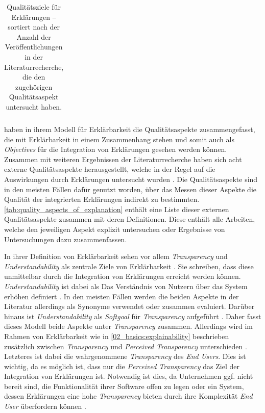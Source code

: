 \begin{table}[b!]
\begin{center}
\begin{tabular}{p{}p{}p{}}
            \toprule
        \end{tabular}
    \end{center}
    \caption{Qualitätsziele für Erklärungen – sortiert nach der Anzahl der Veröffentlichungen in der Literaturrecherche, die den zugehörigen Qualitätsaspekt untersucht haben.}
    \label{tab:quality_aspects_of_explanation}
\end{table}

\citeauthor{chazette_knowledge_nodate} haben in ihrem Modell für Erklärbarkeit die Qualitätsaspekte zusammengefasst, die mit Erklärbarkeit in einem Zusammenhang stehen und somit auch als \textit{Objectives} für die Integration von Erklärungen gesehen werden können. Zusammen mit weiteren Ergebnissen der Literaturrecherche haben sich acht externe Qualitätsaspekte herausgestellt, welche in der Regel auf die Auswirkungen durch Erklärungen untersucht wurden \cite{nunes_systematic_2017, tintarev2007survey}. Die Qualitätsaspekte sind in den meisten Fällen dafür genutzt worden, über das Messen dieser Aspekte die Qualität der integrierten Erklärungen indirekt zu bestimmten. \autoref{tab:quality_aspects_of_explanation} enthält eine Liste dieser externen Qualitätsaspekte zusammen mit deren Definitionen. Diese enthält alle Arbeiten, welche den jeweiligen Aspekt explizit untersuchen oder Ergebnisse von Untersuchungen dazu zusammenfassen.

In ihrer Definition von Erklärbarkeit sehen \citeauthor{chazette_knowledge_nodate} vor allem \textit{Transparency} und \textit{Understandability} als zentrale Ziele von Erklärbarkeit \cite{chazette_end-users_nodate}. Sie schreiben, dass diese unmittelbar durch die Integration von Erklärungen erreicht werden können. \textit{Understandability} ist dabei als \glqq Das Verständnis von Nutzern über das System erhöhen\grqq{} definiert \cite[vgl.][]{chazette_end-users_nodate}. In den meisten Fällen werden die beiden Aspekte in der Literatur allerdings als Synonyme verwendet \cite{nunes_systematic_2017, carvalho2017quality,tintarev_designing_nodate} oder zusammen evaluiert. Darüber hinaus ist \textit{Understandability} als \textit{Softgoal} für \textit{Transparency} aufgeführt \cite{do2010software}. Daher fasst dieses Modell beide Aspekte unter \textit{Transparency} zusammen. Allerdings wird im Rahmen von Erklärbarkeit wie in \autoref{02_basics:explainability} beschrieben zusätzlich zwischen \textit{Transparency} und \textit{Perceived Transparency} unterschieden \cite{nunes_systematic_2017}. Letzteres ist dabei die wahrgenommene \textit{Transparency} des \textit{End Users}. Dies ist wichtig, da es möglich ist, dass nur die \textit{Perceived Transparency} das Ziel der Integration von Erklärungen ist. Notwendig ist dies, da Unternehmen ggf. nicht bereit sind, die Funktionalität ihrer Software offen zu legen oder ein System, dessen Erklärungen eine hohe \textit{Transparency} bieten durch ihre Komplexität \textit{End User} überfordern können \cite{chazette_knowledge_nodate}.

